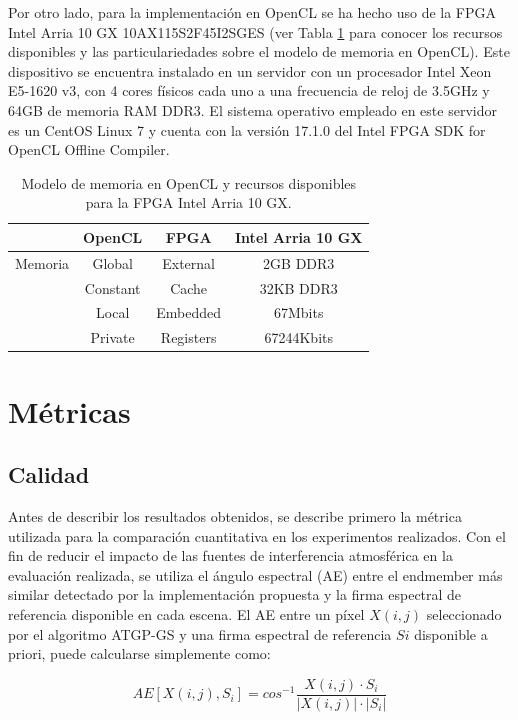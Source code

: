 Por otro lado, para la implementación en OpenCL se ha hecho uso de la FPGA Intel Arria 10 GX 10AX115S2F45I2SGES (ver Tabla \ref{Arria10} para conocer los recursos disponibles y las particulariedades sobre el modelo de memoria en OpenCL). Este dispositivo se encuentra instalado en un servidor con un procesador Intel Xeon E5-1620 v3, con 4 cores físicos cada uno a una frecuencia de reloj de 3.5GHz y 64GB de memoria RAM DDR3. El sistema operativo empleado en este servidor es un CentOS Linux 7 y cuenta con la versión 17.1.0 del Intel FPGA SDK for OpenCL Offline Compiler.

\begin{table}[htb]
	\centering
	\begin{tabular}{|l|c|c|c|}
		\hline
		 & OpenCL & FPGA & Intel Arria 10 GX\\
		 \hline \hline
		 Memoria & Global & External &2GB DDR3\\ \hline 
		 & Constant &  Cache & 32KB DDR3\\ \hline 
		 & Local & Embedded & 67Mbits\\ \hline 
		 & Private & Registers & 67244Kbits \\ \hline
	\end{tabular}
	\caption{Modelo de memoria en OpenCL y recursos disponibles para la FPGA Intel Arria 10 GX.}
	\label{Arria10}
\end{table}

\section{Métricas}

\subsection{Calidad}
Antes de describir los resultados obtenidos, se describe primero la métrica utilizada para la comparación cuantitativa en los experimentos realizados. Con el fin de reducir el impacto de las fuentes de interferencia atmosférica en la evaluación realizada, se utiliza el ángulo espectral (AE) entre el endmember más similar detectado por la implementación propuesta y la firma espectral de referencia disponible en cada escena. El AE entre un píxel $X(i, j)$ seleccionado por el algoritmo ATGP-GS y una firma espectral de referencia $Si$ disponible a priori, puede calcularse simplemente como:

\begin{equation}\label{eq:ae}
AE[X(i,j), S_i] = cos^{-1} \frac{X(i,j) \cdot S_i}{|X(i,j)| \cdot |S_i|}
\end{equation}

